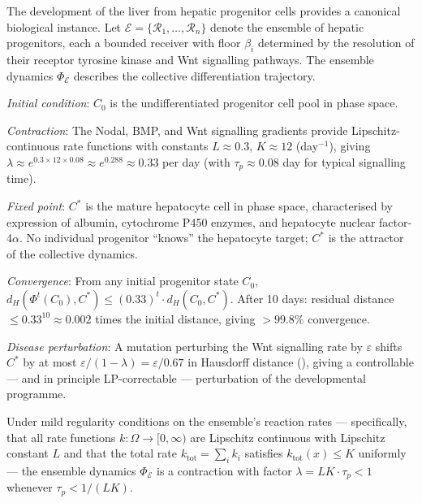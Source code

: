 \begin{example}
\label{ex:organ-development}
The development of the liver from hepatic progenitor cells provides a
canonical biological instance.  Let $\mathcal{E} = \{\mathcal{R}_1, \ldots,
\mathcal{R}_n\}$ denote the ensemble of hepatic progenitors, each a bounded
receiver with floor $\beta_i$ determined by the resolution of their receptor
tyrosine kinase and Wnt signalling pathways.  The ensemble dynamics
$\Phi_\mathcal{E}$ describes the collective differentiation trajectory.

\textit{Initial condition}: $C_0$ is the undifferentiated progenitor cell pool
in phase space.

\textit{Contraction}: The Nodal, BMP, and Wnt signalling gradients provide
Lipschitz-continuous rate functions with constants $L \approx 0.3$,
$K \approx 12$ (day$^{-1}$), giving $\lambda \approx e^{0.3 \times 12 \times 0.08}
\approx e^{0.288} \approx 0.33$ per day (with $\tau_p \approx 0.08$ day for
typical signalling time).

\textit{Fixed point}: $C^*$ is the mature hepatocyte cell in phase space,
characterised by expression of albumin, cytochrome P450 enzymes, and hepatocyte
nuclear factor-4$\alpha$.  No individual progenitor ``knows'' the hepatocyte
target; $C^*$ is the attractor of the collective dynamics.

\textit{Convergence}: From any initial progenitor state $C_0$,
$d_H(\Phi^t(C_0), C^*) \leq (0.33)^t \cdot d_H(C_0, C^*)$.
After 10 days: residual distance $\leq 0.33^{10} \approx 0.002$ times
the initial distance, giving $>99.8\%$ convergence.

\textit{Disease perturbation}: A mutation perturbing the Wnt signalling rate
by $\varepsilon$ shifts $C^*$ by at most $\varepsilon/(1-\lambda) = \varepsilon/0.67$
in Hausdorff distance (), giving a
controllable — and in principle LP-correctable — perturbation of the
developmental programme.
\end{example}

\begin{proposition}
\label{prop:lipschitz-reaction}
Under mild regularity conditions on the ensemble's reaction rates — specifically,
that all rate functions $k : \Omega \to [0, \infty)$ are Lipschitz continuous
with Lipschitz constant $L$ and that the total rate $k_{\mathrm{tot}} = \sum_i k_i$
satisfies $k_{\mathrm{tot}}(x) \leq K$ uniformly — the ensemble dynamics
$\Phi_\mathcal{E}$ is a contraction with factor $\lambda = LK \cdot \tau_p < 1$
whenever $\tau_p < 1/(LK)$.
\end{proposition}

